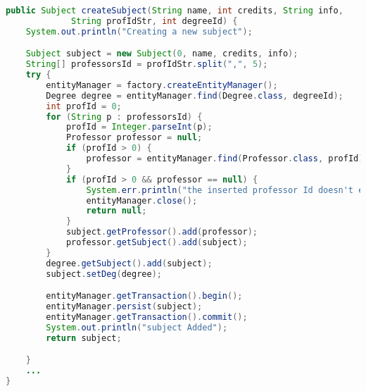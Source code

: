 \begin{lstlisting}[language=Java,  basicstyle=\footnotesize]
public Subject createSubject(String name, int credits, String info,
			 String profIdStr, int degreeId) {
	System.out.println("Creating a new subject");

	Subject subject = new Subject(0, name, credits, info);
	String[] professorsId = profIdStr.split(",", 5);
	try {
		entityManager = factory.createEntityManager();
		Degree degree = entityManager.find(Degree.class, degreeId);
		int profId = 0;
		for (String p : professorsId) {
			profId = Integer.parseInt(p);
			Professor professor = null;
			if (profId > 0) {
				professor = entityManager.find(Professor.class, profId);
			}
			if (profId > 0 && professor == null) {
				System.err.println("the inserted professor Id doesn't exixst");
				entityManager.close();
				return null;
			}
			subject.getProfessor().add(professor);
			professor.getSubject().add(subject);
		}
		degree.getSubject().add(subject);
		subject.setDeg(degree);

		entityManager.getTransaction().begin();
		entityManager.persist(subject);
		entityManager.getTransaction().commit();
		System.out.println("subject Added");
		return subject;

	}
    ...
}
\end{lstlisting}